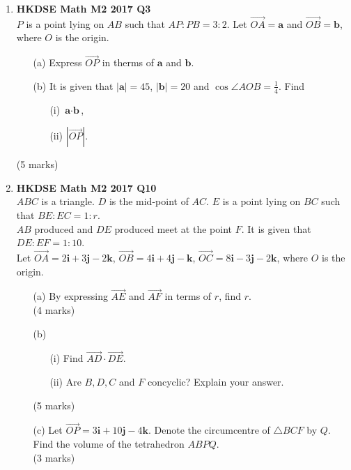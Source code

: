 \documentclass[12pt]{article}
\begin{document}
\begin{enumerate}
	\item \textbf{HKDSE Math M2 2017 Q3}\\
	$P$ is a point lying on $AB$ such that $AP : PB = 3:2$. Let $\overrightarrow{OA} = \textbf{a}$ and $\overrightarrow{OB} = \textbf{b}$, where $O$ is the origin.
	\begin{enumerate}
		\item [(a)] Express $\overrightarrow{OP} $ in therms of $ \textbf{a}$ and $ \textbf{b}$.
		\item [(b)] It is given that $|\textbf{a}| = 45$, $|\textbf{b}| = 20$ and $\cos{\angle{AOB}} = \displaystyle\frac{1}{4}$. Find
		\begin{enumerate}
			\item [(i)] $\textbf{a}   \cdot  \textbf{b} $, 
			\item [(ii)] $|\overrightarrow{OP}| $. 
		\end{enumerate}
	\end{enumerate}
	(5 marks)

	\item \textbf{HKDSE Math M2 2017 Q10}\\
	$ABC$ is a triangle. $D$ is the mid-point of $AC$. $E$ is a point lying on $BC$ such that $BE : EC = 1 : r$. \\
	$AB$ produced and $DE$ produced meet at the point $F$. It is given that $DE : EF = 1 : 10$. \\
	Let $\overrightarrow{OA} = 2\textbf{i} +3 \textbf{j} -2\textbf {k}$, 
		$\overrightarrow{OB} = 4\textbf{i} +4 \textbf{j} - \textbf {k}$, 
		$\overrightarrow{OC} = 8\textbf{i} -3 \textbf{j} -2\textbf {k}$, where $O$ is the origin.
	\begin{enumerate}
		\item [(a)]By expressing $\overrightarrow{AE}$ and $\overrightarrow{AF}$ in terms of $r$, find $r$.\\(4 marks)
		\item [(b)]
		\begin{enumerate}
			\item [(i)]Find $\overrightarrow{AD} \cdot \overrightarrow{DE}$. 
			\item [(ii)]Are $B, D, C$ and $F$ concyclic? Explain your answer.
		\end{enumerate}
		(5 marks)
		\item[(c)]Let $\overrightarrow{OP} = 3\textbf{i} +10 \textbf{j} -4\textbf {k}$. Denote the circumcentre of $\triangle BCF $ by $ Q$.\\
		Find the volume of the tetrahedron $ABPQ$.\\(3 marks)
	\end{enumerate}


\end{enumerate}
\end{document}

